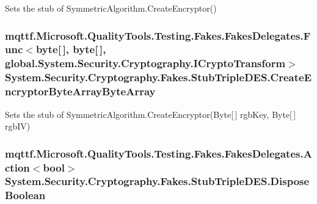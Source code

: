 Sets the stub of Symmetric\-Algorithm.\-Create\-Encryptor()

\hypertarget{class_system_1_1_security_1_1_cryptography_1_1_fakes_1_1_stub_triple_d_e_s_aa36c8bc44e82b3354b2eba81c82e7dc8}{
\subsubsection[{Create\-Encryptor\-Byte\-Array\-Byte\-Array}]{\setlength{\rightskip}{0pt plus 5cm}mqttf.\-Microsoft.\-Quality\-Tools.\-Testing.\-Fakes.\-Fakes\-Delegates.\-Func$<$byte\mbox{[}$\,$\mbox{]}, byte\mbox{[}$\,$\mbox{]}, global.\-System.\-Security.\-Cryptography.\-I\-Crypto\-Transform$>$ System.\-Security.\-Cryptography.\-Fakes.\-Stub\-Triple\-D\-E\-S.\-Create\-Encryptor\-Byte\-Array\-Byte\-Array}}\label{class_system_1_1_security_1_1_cryptography_1_1_fakes_1_1_stub_triple_d_e_s_aa36c8bc44e82b3354b2eba81c82e7dc8}


Sets the stub of Symmetric\-Algorithm.\-Create\-Encryptor(\-Byte\mbox{[}$\,$\mbox{]} rgb\-Key, Byte\mbox{[}$\,$\mbox{]} rgb\-I\-V)

\hypertarget{class_system_1_1_security_1_1_cryptography_1_1_fakes_1_1_stub_triple_d_e_s_a5a9b67351f4def7cb90a5060b4e13b13}{
\subsubsection[{Dispose\-Boolean}]{\setlength{\rightskip}{0pt plus 5cm}mqttf.\-Microsoft.\-Quality\-Tools.\-Testing.\-Fakes.\-Fakes\-Delegates.\-Action$<$bool$>$ System.\-Security.\-Cryptography.\-Fakes.\-Stub\-Triple\-D\-E\-S.\-Dispose\-Boolean}}\label{class_system_1_1_security_1_1_cryptography_1_1_fakes_1_1_stub_triple_d_e_s_a5a9b67351f4def7cb90a5060b4e13b13}


